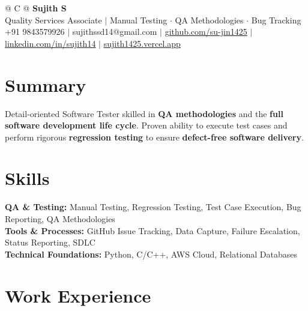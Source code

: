 \documentclass[a4paper,10pt]{article}
\newcommand{\ulink}[2]{\href{#1}{\uline{#2}}}
\begin{document}
\pagestyle{empty}

\begin{tabularx}{\linewidth}{@{} C @{}}
{\color[HTML]{000000}\fontsize{30}{35}\selectfont\bfseries Sujith S} \\[5pt]
{\fontsize{10.5}{12.5}\selectfont\color[HTML]{3A3A3A}
Quality Services Associate $|$ Manual Testing $\cdot$ QA Methodologies $\cdot$ Bug Tracking} \\[6pt]
{\fontsize{9.5}{11.5}\selectfont\textcolor[HTML]{3A3A3A}{+91 9843579926 $|$ sujithssd14@gmail.com $|$ \ulink{https://github.com/su-jin1425}{github.com/su-jin1425} $|$ \ulink{https://linkedin.com/in/sujith14}{linkedin.com/in/sujith14} $|$ \ulink{https://sujith1425.vercel.app}{sujith1425.vercel.app}}}
\end{tabularx}

\vspace{2pt}

\section{Summary}
\vspace{3pt}
{\color[HTML]{0A0A0A}\fontsize{11}{14}\selectfont
Detail-oriented Software Tester skilled in \textbf{QA methodologies} and the \textbf{full software development life cycle}. Proven ability to execute test cases and perform rigorous \textbf{regression testing} to ensure \textbf{defect-free software delivery}.}

\vspace{2pt}

\section{Skills}
\vspace{3pt}
{\color[HTML]{0A0A0A}\fontsize{11}{14}\selectfont
\textbf{QA \& Testing:} Manual Testing, Regression Testing, Test Case Execution, Bug Reporting, QA Methodologies \\[2pt]
\textbf{Tools \& Processes:} GitHub Issue Tracking, Data Capture, Failure Escalation, Status Reporting, SDLC \\[2pt]
\textbf{Technical Foundations:} Python, C/C++, AWS Cloud, Relational Databases}

\vspace{2pt}

\section{Work Experience}
\vspace{2pt}
\end{document}
